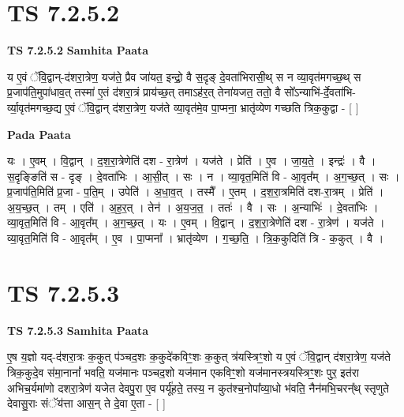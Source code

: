 \documentclass[17pt]{extarticle}
\begin{document}
\section*{ TS 7.2.5.2 }

\textbf{TS 7.2.5.2 } \newline
\textbf{Samhita Paata} \newline

य ए॒वं ॅवि॒द्वान्-द॑शरा॒त्रेण॒ यज॑ते॒ प्रैव जा॑यत॒ इन्द्रो॒ वै स॒दृङ् दे॒वता॑भिरासी॒थ् स न व्या॒वृत॑मगच्छ॒थ् स प्र॒जाप॑ति॒मुपा॑धाव॒त् तस्मा॑ ए॒तं द॑शरा॒त्रं प्राय॑च्छ॒त् तमाऽह॑र॒त् तेना॑यजत॒ ततो॒ वै सो᳚ऽन्याभि॑-र्दे॒वता॑भि-र्व्या॒वृत॑मगच्छ॒द्य ए॒वं ॅवि॒द्वान् द॑शरा॒त्रेण॒ यज॑ते व्या॒वृत॑मे॒व पा॒प्मना॒ भ्रातृ॑व्येण गच्छति त्रिक॒कुद्वा - [  ] \newline

\textbf{Pada Paata} \newline

यः । ए॒वम् । वि॒द्वान् । द॒श॒रा॒त्रेणेति॑ दश - रा॒त्रेण॑ । यज॑ते । प्रेति॑ । ए॒व । जा॒य॒ते॒ । इन्द्रः॑ । वै । स॒दृङ्ङिति॑ स - दृङ् । दे॒वता॑भिः । आ॒सी॒त् । सः । न । व्या॒वृत॒मिति॑ वि - आ॒वृत᳚म् । अ॒ग॒च्छ॒त् । सः । प्र॒जाप॑ति॒मिति॑ प्र॒जा - प॒ति॒म् । उपेति॑ । अ॒धा॒व॒त् । तस्मै᳚ । ए॒तम् । द॒श॒रा॒त्रमिति॑ दश-रा॒त्रम् । प्रेति॑ । अ॒य॒च्छ॒त् । तम् । एति॑ । अ॒ह॒र॒त् । तेन॑ । अ॒य॒ज॒त॒ । ततः॑ । वै । सः । अ॒न्याभिः॑ । दे॒वता॑भिः । व्या॒वृत॒मिति॑ वि - आ॒वृत᳚म् । अ॒ग॒च्छ॒त् । यः । ए॒वम् । वि॒द्वान् । द॒श॒रा॒त्रेणेति॑ दश - रा॒त्रेण॑ । यज॑ते । व्या॒वृत॒मिति॑ वि - आ॒वृत᳚म् । ए॒व । पा॒प्मना᳚ । भ्रातृ॑व्येण । ग॒च्छ॒ति॒ । त्रि॒क॒कुदिति॑ त्रि - क॒कुत् । वै ।  \newline




\section*{ TS 7.2.5.3 }

\textbf{TS 7.2.5.3 } \newline
\textbf{Samhita Paata} \newline

ए॒ष य॒ज्ञो यद्-द॑शरा॒त्रः क॒कुत् प॑ञ्चद॒शः क॒कुदे॑कविꣳ॒॒शः क॒कुत् त्र॑यस्त्रिꣳ॒॒शो य ए॒वं ॅवि॒द्वान् द॑शरा॒त्रेण॒ यज॑ते त्रिक॒कुदे॒व स॑मा॒नानां᳚ भवति॒ यज॑मानः पञ्चद॒शो यज॑मान एकविꣳ॒॒शो यज॑मानस्त्रयस्त्रिꣳ॒॒शः पुर॒ इत॑रा अभिच॒र्यमा॑णो दशरा॒त्रेण॑ यजेत देवपु॒रा ए॒व पर्यू॑हते॒ तस्य॒ न कुत॑श्च॒नोपा᳚व्या॒धो भ॑वति॒ नैन॑मभि॒चरन्᳚थ् स्तृणुते देवासु॒राः संॅय॑त्ता आस॒न् ते दे॒वा ए॒ता - [  ] \newline
\end{document}
